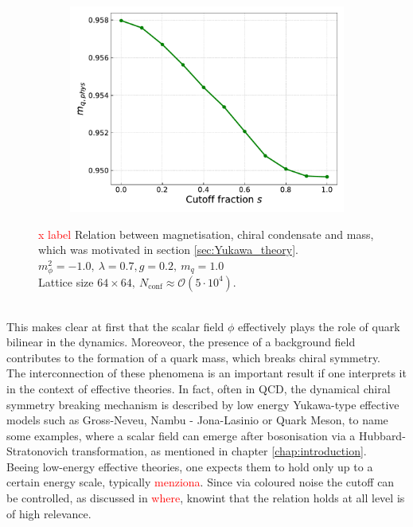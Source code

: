 \begin{figure}[h]
\begin{subfigure}[b]{0.48\textwidth}
        \includegraphics[width=1.0\textwidth]{figures/slide_broken/mass.pdf}
    \end{subfigure}
    \caption[Relation between magnetisation, condensate and mass]{\textcolor{red}{x label} Relation between magnetisation, chiral condensate and mass, which was motivated in section \ref{sec:Yukawa_theory}. \\ $m_\phi^2=-1.0, \ \lambda=0.7, g=0.2, \ m_q = 1.0$ \\ Lattice size $64 \times 64, \ N_\text{conf} \approx \mathcal{O}(5 \cdot 10^4)$.}
    \label{fig:interpolation_relation_phi_cond_mass}
\end{figure} \\
This makes clear at first that the scalar field $\phi$ effectively plays the role of quark bilinear in the dynamics. Moreoveor, the presence of a background field contributes to the formation of a quark mass, which breaks chiral symmetry. \\
The interconnection of these phenomena is an important result if one interprets it in the context of effective theories. In fact, often in QCD, the dynamical chiral symmetry breaking mechanism is described by low energy Yukawa-type effective models such as Gross-Neveu, Nambu - Jona-Lasinio or Quark Meson, to name some examples, where a scalar field can emerge after bosonisation via a Hubbard-Stratonovich transformation, as mentioned in chapter \ref{chap:introduction}. \\
Beeing low-energy effective theories, one expects them to hold only up to a certain energy scale, typically \textcolor{red}{menziona}. Since via coloured noise the cutoff can be controlled, as discussed in \textcolor{red}{where}, knowint that the relation holds at all level is of high relevance. \\
